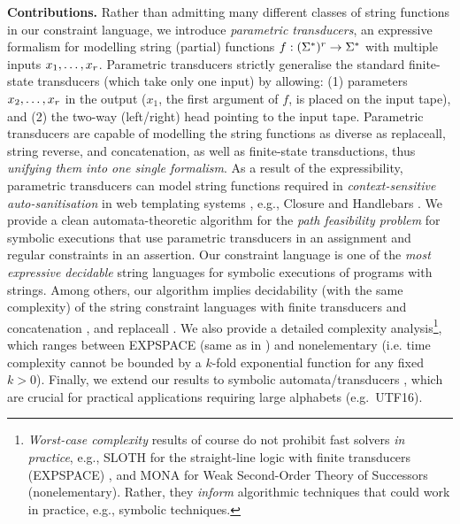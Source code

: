 
\smallskip
\noindent
\textbf{Contributions.} Rather than admitting many different classes of string 
functions in our constraint language, 
%
%
we introduce \emph{parametric 
transducers}, an expressive formalism for modelling string (partial) functions 
$f: (\Sigma^*)^r \to \Sigma^*$ with multiple inputs $x_1,\ldots, 
x_r$. Parametric
transducers strictly generalise the standard finite-state transducers (which take only
one input) by allowing: (1) parameters $x_2,\ldots,x_r$ in the output
($x_1$, the first argument of $f$, is placed on the input tape), 
and (2) the two-way (left/right) head pointing to the input tape. 
Parametric transducers are capable of modelling the string functions as 
diverse as replaceall, string reverse, and concatenation, as well as finite-state transductions, thus \emph{unifying them into one single formalism}.
As a result of the expressibility, parametric transducers can model string functions required in \emph{context-sensitive
auto-sanitisation} in web templating systems \cite{SSS11}, e.g., Closure 
\cite{Closure} and Handlebars \cite{Handlebars}. 
We provide a clean automata-theoretic algorithm for the \emph{path 
feasibility problem} for symbolic executions that use parametric transducers in 
an assignment and regular constraints in an assertion. Our constraint language
is one of the \emph{most expressive decidable} string languages for symbolic 
executions of programs with strings.
Among others, our algorithm implies decidability (with the same complexity)
of the string constraint 
languages with finite transducers and concatenation \cite{LB16}, and
replaceall \cite{CCHLW18}.
We also provide a detailed complexity 
analysis\footnote{
\emph{Worst-case complexity} results of course do not prohibit fast solvers 
\emph{in practice}, e.g., SLOTH for the straight-line 
logic with finite transducers (EXPSPACE) 
\cite{HJLRV18}, and MONA for Weak Second-Order
Theory of Successors (nonelementary). Rather, they
\emph{inform} algorithmic techniques that could work in practice, e.g., 
symbolic techniques.},
which ranges between EXPSPACE (same as in \cite{LB16,CCHLW18}) and
nonelementary (i.e. time complexity cannot be bounded by a $k$-fold exponential
function for any fixed $k > 0$). 
Finally, we extend our results to symbolic automata/transducers
\cite{BEK,symbolic-transducer,DV13,symbolic-transducer-power}, which are crucial for practical 
applications requiring large alphabets (e.g.~UTF16).




